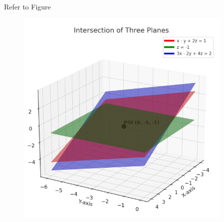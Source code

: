 \documentclass[journal]{IEEEtran}
\begin{document}
Refer to Figure

\begin{figure}[H]
\begin{center}
\includegraphics[width=0.6\columnwidth]{figs/graph9.png}
\end{center}
\caption{}
\label{fig:Fig}
\end{figure}
\end{document}
